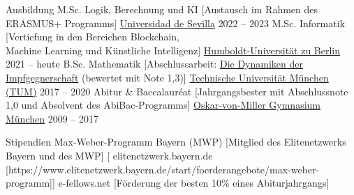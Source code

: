 \documentclass[
]{llresume}
\begin{document}
\makeheader

\begin{mainpane}
    \begin{mainsection}{Ausbildung}
        \entryJob
            {M.Sc. Logik, Berechnung und KI}
            [Austausch im Rahmen des ERASMUS+ Programms]
            {\href{https://www.informatica.us.es/index.php/masteres/mulcia}{Universidad de Sevilla}}
            {2022 -- 2023}
        \entryJob
            {M.Sc. Informatik}
            [Vertiefung in den Bereichen Blockchain,\\Machine Learning und Künstliche Intelligenz]
            {\href{https://www.informatik.hu-berlin.de/de/studium/Master/Master}{Humboldt-Universität zu Berlin}}
            {2021 -- heute}
        \entryJob
            {B.Sc. Mathematik}
            [Abschlussarbeit: \href{https://julienandco.github.io/the-dynamics-of-vaccine-hesitancy/bachelor_thesis_julien_caselmann.pdf}{Die Dynamiken der Impfgegnerschaft} (bewertet mit Note 1,3)]
            {\href{https://www.ma.tum.de/}{Technische Universität München (TUM)}}
            {2017 -- 2020}
        \entryJob
            {Abitur \& Baccalauréat}
            [Jahrgangsbester mit Abschlussnote 1,0 und Absolvent des AbiBac-Programms]
            {\href{https://www.ovmg.de/}{Oskar-von-Miller Gymnasium München}}
            {2009 -- 2017}
    \end{mainsection}
    
    \begin{mainsection}{Stipendien}
        \entryGeneric
            {Max-Weber-Programm Bayern (MWP)} 
            [Mitglied des Elitenetzwerks Bayern und des MWP]
            [\infoHomepage
                {elitenetzwerk.bayern.de}
                [https://www.elitenetzwerk.bayern.de/start/foerderangebote/max-weber-programm]]
        \entryGeneric
            {e-fellows.net} 
            [Förderung der besten 10\% eines Abiturjahrgangs]
    \end{mainsection}
    
    

\end{mainpane}
\end{document}
